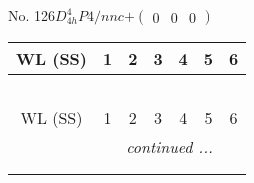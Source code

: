 \documentclass[fleqn,9pt,landscape]{jsarticle}
\begin{document}
\newpage
No. 126\quad$D_{4h}^{4}$\quad$P4/nnc$\quad[ tetragonal ]\quad$+\begin{pmatrix} 0 & 0 & 0 \end{pmatrix}$
\begin{center}
\renewcommand{\arraystretch}{1.2}
\begin{longtable}{ccccccc}
 \hline \hline
WL (SS) & 1 & 2 & 3 & 4 & 5 & 6 \\ \hline \endfirsthead

\multicolumn{6}{l}{\tablename\ \thetable{}} \\
 \hline \hline
WL (SS) & 1 & 2 & 3 & 4 & 5 & 6 \\ \hline \endhead

 \hline \hline
\multicolumn{6}{r}{\footnotesize\it continued ...} \\ \endfoot

 \hline \hline
\multicolumn{6}{r}{} \\ \endlastfoot


\end{longtable}
\end{center}
\end{document}
